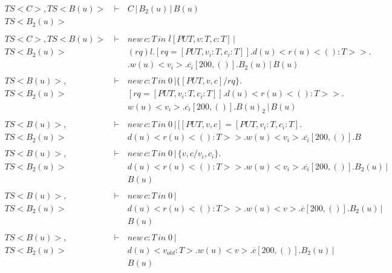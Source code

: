 \setcounter{equation}{0}
\begin{eqnarray*}
 \ TS<C>,TS<B(u)>\, &\vdash\,&  C\,|\,B_2(u)\,|\,B(u) \\
 \ TS<B_2(u)>       &        &          \\
 \               &        &          \\
 \ TS<C>,TS<B(u)>\, &\vdash\,& new\,c:T\,in\;\overline{l}[PUT,v:T,c:T]\,|\\
 \ TS<B_2(u)>       &\,      & (rq)l.[rq = [PUT,v_i:T,c_i:T]].d(u)<r(u)<():T>>.\\
 \               &\,      & .w(u)<v_i>.\overline{c_i}[200,()].B_2(u)\,|\,B(u)\\
 \               &        &          \\
 \ TS<B(u)>,         &\vdash\,& new\,c:T\,in\;0\,|\{[PUT,v,c]/rq\}.\\
 \ TS<B_2(u)>              &\,      & [rq = [PUT,v_i:T,c_i:T]].d(u)<r(u)<():T>>.\\
 \               &\,      & w(u)<v_i>.\overline{c_i}[200,()].B(u)_2\,|\,B(u)\\
 \               &        &          \\
 \ TS<B(u)>,         &\vdash\,& new\,c:T\,in\;0\,|\,[[PUT,v,c]=[PUT,v_i:T,c_i:T].\\
 \ TS<B_2(u)>              &\,      & d(u)<r(u)<():T>>.w(u)<v_i>.\overline{c_i}[200,()].B\\
 \               &        &          \\
 \ TS<B(u)>,         &\vdash\,& new\,c:T\,in\;0\,|\,\{v,c/v_i,c_i\}.\\
 \ TS<B_2(u)>              &\,      & d(u)<r(u)<():T>>.w(u)<v_i>.\overline{c_i}[200,()].B_2(u)\,|\\
 \               &        & B(u)\\
 \               &        &          \\
 \ TS<B(u)>,         &\vdash\,& new\,c:T\,in\;0\,|\,\\
 \ TS<B_2(u)>              &      & d(u)<r(u)<():T>>.w(u)<v>.\overline{c}[200,()].B_2(u)\,|\\
 \               &        & B(u)\\
 \               &        &          \\
 \ TS<B(u)>,         &\vdash\,& new\,c:T\,in\;0\,|\,\\
 \ TS<B_2(u)>              &      & d(u)<v_{old}:T>.w(u)<v>.\overline{c}[200,()].B_2(u)\,|\\
 \               &        &  B(u)\\

\end{eqnarray*}
